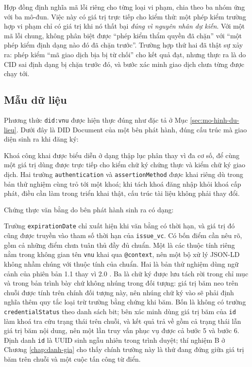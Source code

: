 Hợp đồng định nghĩa mã lỗi riêng cho từng loại vi phạm, chia theo ba nhóm ứng với ba mô-đun. Việc này có giá trị trực tiếp cho kiểm thử: một phép kiểm trường hợp vi phạm chỉ có giá trị khi nó thất bại \emph{đúng vì nguyên nhân dự kiến}. Với một mã lỗi chung, không phân biệt được ``phép kiểm thẩm quyền đã chặn'' với ``một phép kiểm định dạng nào đó đã chặn trước''. Trường hợp thứ hai đã thật sự xảy ra: phép kiểm ``mã giao dịch bịa bị từ chối'' cho kết quả đạt, nhưng thực ra là do CID sai định dạng bị chặn trước đó, và bước xác minh giao dịch chưa từng được chạy tới.

\subsection{Mẫu dữ liệu}

Phương thức \texttt{did:vnu} được hiện thực đúng như đặc tả ở Mục \ref{sec:mo-hinh-du-lieu}. Dưới đây là DID Document của một bên phát hành, đúng cấu trúc mà giao diện sinh ra khi đăng ký:



Khoá công khai được biểu diễn ở dạng thập lục phân thay vì đa cơ số, để cùng một giá trị dùng được trực tiếp cho kiểm chữ ký chứng thực và kiểm chữ ký giao dịch. Hai trường \texttt{authentication} và \texttt{assertionMethod} được khai riêng dù trong bản thử nghiệm cùng trỏ tới một khoá; khi tách khoá đăng nhập khỏi khoá cấp phát, điều cần làm trong triển khai thật, cấu trúc tài liệu không phải thay đổi.

Chứng thực văn bằng do bên phát hành sinh ra có dạng:



Trường \texttt{expirationDate} chỉ xuất hiện khi văn bằng có thời hạn, và giá trị đó cũng được truyền vào tham số thời hạn của \texttt{issue\_vc}. Có bốn điểm cần nêu rõ, gồm cả những điểm chưa tuân thủ đầy đủ chuẩn. Một là các thuộc tính riêng nằm trong không gian tên \texttt{vnu} khai qua \texttt{@context}, nên một bộ xử lý JSON-LD không nhầm chúng với thuộc tính của chuẩn. Hai là bản thử nghiệm dùng ngữ cảnh của phiên bản 1.1 thay vì 2.0 \cite{W3C_VCDM2025}. Ba là chữ ký được lưu tách rời trong chỉ mục và trong bản trình bày chứ không nhúng trong đối tượng: giá trị băm neo trên chuỗi được tính trên chính đối tượng này, nên nhúng chữ ký vào sẽ phải định nghĩa thêm quy tắc loại trừ trường bằng chứng khi băm. Bốn là không có trường \texttt{credentialStatus} theo danh sách bit; bên xác minh dùng giá trị băm của \texttt{id} làm khoá tra cứu trạng thái trên chuỗi, và kết quả trả về gồm cả trạng thái lẫn giá trị băm nội dung, nên một lần truy vấn phục vụ được cả bước 5 và bước 6. Định danh \texttt{id} là UUID sinh ngẫu nhiên trong trình duyệt; thí nghiệm B ở Chương \ref{chap:danh-gia} cho thấy chính trường này là thứ đang đứng giữa giá trị băm trên chuỗi và một cuộc tấn công từ điển.


